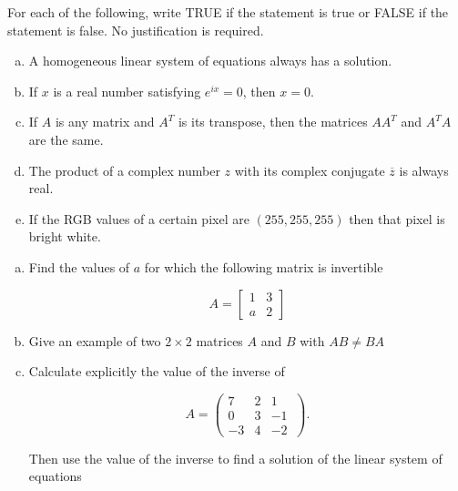 \documentclass[11pt]{exam}
\theoremstyle{definition}
\begin{document}
\begin{questions}
\newpage
\question[10]\mbox{}

For each of the following, write TRUE if the statement is true or FALSE if the statement is false.
No justification is required.

\begin{enumerate}[(a)]
\item  A homogeneous linear system of equations always has a solution.
\vspace{1.5in}
\item  If $x$ is a real number satisfying $e^{ix} = 0$, then $x= 0$.
\vspace{1.5in}
\item  If $A$ is any matrix and $A^T$ is its transpose, then the matrices $AA^T$ and $A^TA$ are the same.
\vspace{1.5in}
\item  The product of a complex number $z$ with its complex conjugate $\overline z$ is always real.
\vspace{1.5in}
\item  If the RGB values of a certain pixel are $(255,255,255)$ then that pixel is bright white.
\end{enumerate}

\newpage
\question[10]\mbox{}

\begin{enumerate}[(a)]
\item  Find the values of $a$ for which the following matrix is invertible

$$A = \left[\begin{array}{cc} 1 & 3\\a & 2\end{array}\right]$$
\vspace{1.5in}

\item  Give an example of two $2\times 2$ matrices $A$ and $B$ with $AB \neq BA$
\vspace{1in}

\item  Calculate explicitly the value of the inverse of

$$A = \left(\begin{array}{ccc}
7 & 2 & 1\\ 0 & 3 & -1\\ -3 & 4 & -2\
\end{array}\right).$$

Then use the value of the inverse to find a solution of the linear system of equations


\end{enumerate}
\end{questions}
\end{document}
